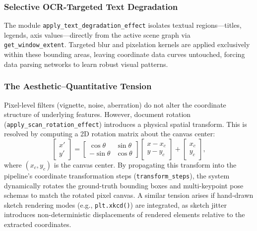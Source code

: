 \documentclass[11pt,twocolumn]{article}
\begin{document}
\subsubsection{Selective OCR-Targeted Text Degradation}\label{sec:text_degrad}

The module \texttt{apply\_text\_degradation\_effect} isolates textual regions---titles, legends, axis values---directly from the active scene graph via \texttt{get\_window\_extent}.
Targeted blur and pixelation kernels are applied exclusively within these bounding areas, leaving coordinate data curves untouched, forcing data parsing networks to learn robust visual patterns.

\subsubsection{The Aesthetic--Quantitative Tension}\label{sec:tension}

Pixel-level filters (vignette, noise, aberration) do not alter the coordinate structure of underlying features.
However, document rotation (\texttt{apply\_scan\_rotation\_effect}) introduces a physical spatial transform. This is resolved by computing a 2D rotation matrix about the canvas center:
\begin{equation}\label{eq:rotation_matrix}
  \begin{bmatrix} x' \\ y' \end{bmatrix} = \begin{bmatrix} \cos\theta & \sin\theta \\ -\sin\theta & \cos\theta \end{bmatrix} \begin{bmatrix} x - x_c \\ y - y_c \end{bmatrix} + \begin{bmatrix} x_c \\ y_c \end{bmatrix},
\end{equation}
where $(x_c, y_c)$ is the canvas center. By propagating this transform into the pipeline's coordinate transformation steps (\texttt{transform\_steps}), the system dynamically rotates the ground-truth bounding boxes and multi-keypoint pose schemas to match the rotated pixel canvas.
A similar tension arises if hand-drawn sketch rendering modes (e.g., \texttt{plt.xkcd()}) are integrated, as sketch jitter introduces non-deterministic displacements of rendered elements relative to the extracted coordinates.
\end{document}
